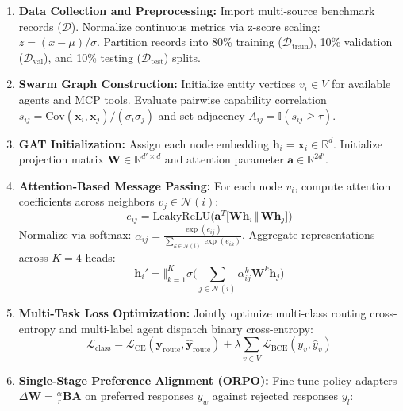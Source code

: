 \documentclass[12pt,a4paper]{report}
\begin{document}
\begin{enumerate}
    \item \textbf{Data Collection and Preprocessing:} Import multi-source benchmark records ($\mathcal{D}$). Normalize continuous metrics via z-score scaling: $z = (x - \mu)/\sigma$. Partition records into 80\% training ($\mathcal{D}_{\text{train}}$), 10\% validation ($\mathcal{D}_{\text{val}}$), and 10\% testing ($\mathcal{D}_{\text{test}}$) splits.
    \item \textbf{Swarm Graph Construction:} Initialize entity vertices $v_i \in V$ for available agents and MCP tools. Evaluate pairwise capability correlation $s_{ij} = \mathrm{Cov}(\mathbf{x}_i, \mathbf{x}_j)/(\sigma_i \sigma_j)$ and set adjacency $A_{ij} = \mathbb{I}(s_{ij} \ge \tau)$.
    \item \textbf{GAT Initialization:} Assign each node embedding $\mathbf{h}_i = \mathbf{x}_i \in \mathbb{R}^d$. Initialize projection matrix $\mathbf{W} \in \mathbb{R}^{d' \times d}$ and attention parameter $\mathbf{a} \in \mathbb{R}^{2d'}$.
    \item \textbf{Attention-Based Message Passing:} For each node $v_i$, compute attention coefficients across neighbors $v_j \in \mathcal{N}(i)$:
    \begin{equation}
        e_{ij} = \mathrm{LeakyReLU}\Big(\mathbf{a}^T \big[\mathbf{W} \mathbf{h}_i \,\Vert\, \mathbf{W} \mathbf{h}_j\big]\Big)
    \end{equation}
    Normalize via softmax: $\alpha_{ij} = \frac{\exp(e_{ij})}{\sum_{k \in \mathcal{N}(i)} \exp(e_{ik})}$. Aggregate representations across $K=4$ heads:
    \begin{equation}
        \mathbf{h}_i' = \Vert_{k=1}^K \sigma\Bigg(\sum_{j \in \mathcal{N}(i)} \alpha_{ij}^k \mathbf{W}^k \mathbf{h}_j\Bigg)
    \end{equation}
    \item \textbf{Multi-Task Loss Optimization:} Jointly optimize multi-class routing cross-entropy and multi-label agent dispatch binary cross-entropy:
    \begin{equation}
        \mathcal{L}_{\text{class}} = \mathcal{L}_{\text{CE}}(\mathbf{y}_{\text{route}}, \hat{\mathbf{y}}_{\text{route}}) + \lambda \sum_{v \in V} \mathcal{L}_{\text{BCE}}(y_v, \hat{y}_v)
    \end{equation}
    \item \textbf{Single-Stage Preference Alignment (ORPO):} Fine-tune policy adapters $\Delta \mathbf{W} = \frac{\alpha}{r}\mathbf{B}\mathbf{A}$ on preferred responses $y_w$ against rejected responses $y_l$:

\end{enumerate}
\end{document}
